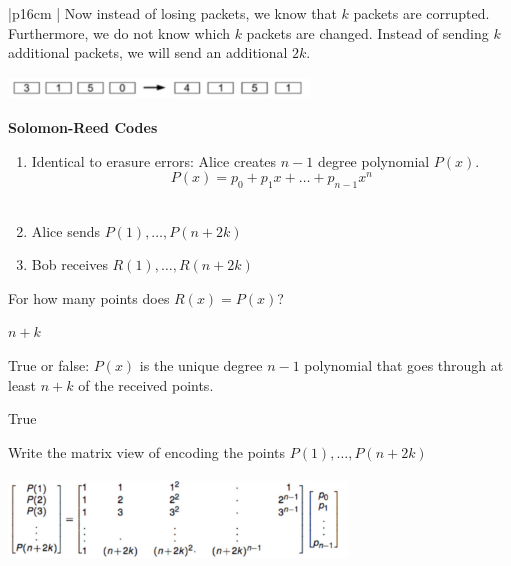 {\tabulinesep=1mm
\begin{tabu}{|p{16cm} |}
\hline
Now instead of losing packets, we know that $k$ packets are corrupted. 
Furthermore, we do not know which $k$ packets are changed. Instead of 
sending $k$ additional packets, we will send an additional $2k$.\newline
\begin{center}
\includegraphics[width=8cm, height=0.6cm]{general_intro.jpg}
\end{center}

\textbf{Solomon-Reed Codes}
\begin{enumerate}
\item Identical to erasure errors: Alice creates $n - 1$ degree polynomial 
$P(x)$.\newline
\[P(x) = p_0 + p_1x + \dotsc + p_{n-1}x^n \] \\
\item Alice sends $P(1), \dotsc, P(n + 2k)$ \\
\item Bob receives $R(1), \dotsc, R(n + 2k) $ \newline
\end{enumerate}

For how many points does $R(x) = P(x)$? \newline
\begin{solution}
$ n + k$
\end{solution}

True or false: $P(x)$ is the unique degree $n - 1$ polynomial that goes 
through at least $n + k$ of the received points.\newline
\begin{solution}
True
\end{solution}

Write the matrix view of encoding the points $P(1), \dotsc, P(n + 2k)$
\begin{solution}[8 cm]
\begin{center}
\includegraphics[width=9cm, height=2.3cm]{general_intro_matrix.jpg}
\end{center}
\end{solution}

\\
\hline
\end{tabu}
}
